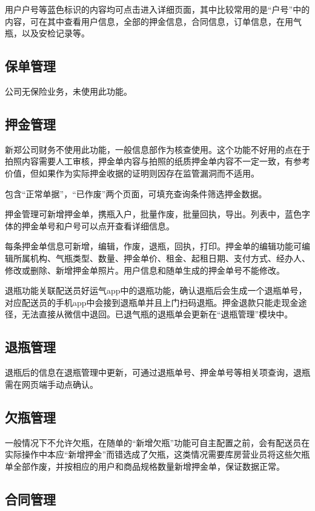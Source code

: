 \documentclass[UTF8]{ctexart}
\begin{document}
用户户号等蓝色标识的内容均可点击进入详细页面，其中比较常用的是“户号”中的内容，可在其中查看用户信息，全部的押金信息，合同信息，订单信息，在用气瓶，以及安检记录等。

\subsection{保单管理}
公司无保险业务，未使用此功能。

\subsection{押金管理}
新郑公司财务不使用此功能，一般信息部作为核查使用。这个功能不好用的点在于拍照内容需要人工审核，押金单内容与拍照的纸质押金单内容不一定一致，有参考价值，但如果作为实际押金收据的证明则因存在监管漏洞而不适用。

包含“正常单据”，“已作废”两个页面，可填充查询条件筛选押金数据。

押金管理可新增押金单，携瓶入户，批量作废，批量回执，导出。列表中，蓝色字体的押金单号和户号可以点开查看详细信息。

每条押金单信息可新增，编辑，作废，退瓶，回执，打印。押金单的编辑功能可编辑所属机构、气瓶类型、数量、押金单价、租金、起租日期、支付方式、经办人、修改或删除、新增押金单照片。用户信息和随单生成的押金单号不能修改。

退瓶功能关联配送员好运气app中的退瓶功能，确认退瓶后会生成一个退瓶单号，对应配送员的手机app中会接到退瓶单并且上门扫码退瓶。押金退款只能走现金途径，无法直接从微信中退回。已退气瓶的退瓶单会更新在“退瓶管理”模块中。

\subsection{退瓶管理}

退瓶后的信息在退瓶管理中更新，可通过退瓶单号、押金单号等相关项查询，退瓶需在网页端手动点确认。

\subsection{欠瓶管理}

一般情况下不允许欠瓶，在随单的“新增欠瓶”功能可自主配置之前，会有配送员在实际操作中本应“新增押金”而错选成了欠瓶，这类情况需要库房营业员将这些欠瓶单全部作废，并按相应的用户和商品规格数量新增押金单，保证数据正常。

\subsection{合同管理}
\end{document}
